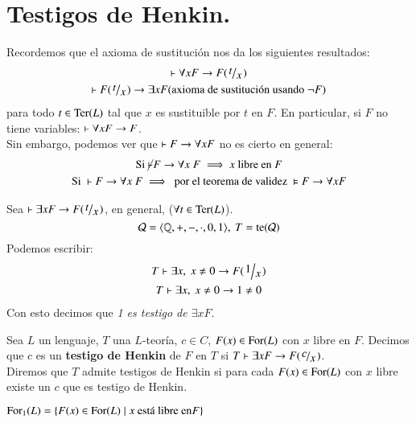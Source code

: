 
\chapter{Testigos de Henkin.}

Recordemos que el axioma de sustitución nos da los siguientes resultados:
\begin{gather*}
    \vdash \forall x F \then F(\quox{t})\\
    \vdash F(\quox{t}) \then \exists x F \text{(axioma de sustitución usando $\neg F$)}
\end{gather*}
para todo $t \in \mathrm{Ter}(L)$ tal que $x$ es sustituible por $t$ en $F$. En particular, si $F$ no tiene variables: $\vdash \forall x F \rightarrow F$.\\
Sin embargo, podemos ver que $\vdash F \rightarrow \forall x F$ no es cierto en general:
\begin{gather*}
    \text{Si }\cancel\vdash F \rightarrow \forall x\ F \implies x \text{ libre en } F\\
    \text{Si } \vdash F \rightarrow \forall x\ F \implies \text{ por el teorema de validez } \vDash F \rightarrow \forall x F
\end{gather*}

\begin{eg}
    Sea $\vdash \exists x F \then F(\quox t)$, en general, ($\forall t \in \mathrm{Ter}(L)$).
    $$
        \mathcal{Q} = \langle\mathbb{Q}, +, -, \cdot, 0, 1\rangle,\ T=\mathrm{te}(\mathcal{Q})
    $$
    Podemos escribir:
    \begin{gather*}
        T \vdash \exists x,\ x \neq 0 \then F(\quox 1)\\
        T \vdash \exists x,\ x \neq 0 \then 1 \neq 0
    \end{gather*}
    Con esto decimos que \textit{1 es testigo de $\exists x F$}.
\end{eg}

\begin{dfn}
    Sea $L$ un lenguaje, $T$ una $L$-teoría, $c \in C$, $F(x) \in \mathrm{For}(L)$ con $x$ libre en $F$. Decimos que $c$ es un \textbf{testigo de Henkin} de $F$ en $T$ si $T\vdash \exists x F \then F(\quox{c})$.\\
    Diremos que $T$ admite testigos de Henkin si para cada $F(x) \in \mathrm{For}(L)$ con $x$ libre existe un $c$ que es testigo de Henkin.
\end{dfn}

\begin{obs}[Notación]
    $\mathrm{For}_1(L) = \left\{F(x) \in \mathrm{For}(L) \mid x\text{ está libre en} F\right\}$
\end{obs}

